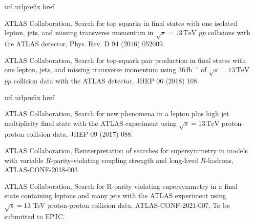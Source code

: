 \begin{thebibliography}{10}
\makeatletter
\renewcommand\@biblabel[1]{}
\makeatother
\expandafter\ifx\csname url\endcsname\relax
  \def\url#1{\texttt{#1}}\fi
\expandafter\ifx\csname urlprefix\endcsname\relax\def\urlprefix{URL }\fi
\expandafter\ifx\csname href\endcsname\relax
  \def\href#1#2{#2} \def\path#1{#1}\fi
  
{ATLAS Collaboration}, {Search for top squarks in final states with one
  isolated lepton, jets, and missing transverse momentum in \(\sqrt{s} =
  13\,\text{TeV}\) \(pp\) collisions with the ATLAS detector},
  \href {http://dx.doi.org/10.1103/PhysRevD.94.052009}
  {Phys. Rev. D 94 (2016) 052009}.


{ATLAS Collaboration}, {Search for top-squark pair production in final states
  with one lepton, jets, and missing transverse momentum using
  \(36\,\text{fb}^{-1}\) of \(\sqrt{s} = 13\,\text{TeV}\) \(pp\) collision data
  with the ATLAS detector}, 
  \href {http://dx.doi.org/10.1007/JHEP06(2018)108}
  {JHEP 06 (2018) 108}.
  
\end{thebibliography}

\begin{thebibliography}{10}
\makeatletter
\renewcommand\@biblabel[1]{}
\makeatother
\expandafter\ifx\csname url\endcsname\relax
  \def\url#1{\texttt{#1}}\fi
\expandafter\ifx\csname urlprefix\endcsname\relax\def\urlprefix{URL }\fi
\expandafter\ifx\csname href\endcsname\relax
  \def\href#1#2{#2} \def\path#1{#1}\fi

{ATLAS Collaboration}, {Search for new phenomena in a lepton plus high jet
  multiplicity final state with the ATLAS experiment using \(\sqrt{s} =
  13\,\text{TeV}\) proton--proton collision data}, 
  \href {http://dx.doi.org/10.1007/JHEP09(2017)088}
  {JHEP 09 (2017) 088}.
  
  
{ATLAS Collaboration}, {Reinterpretation of searches for
  supersymmetry in models with variable \(R\)-parity-violating coupling
  strength and long-lived \(R\)-hadrons}, 
  \href{https://cds.cern.ch/record/2308391}{ATLAS-CONF-2018-003}.  


{ATLAS Collaboration}, {Search
  for R-parity violating supersymmetry in a final state containing leptons and
  many jets with the ATLAS experiment using $\sqrt{s}=13$ TeV proton-proton
  collision data}, \href{https://atlas.web.cern.ch/Atlas/GROUPS/PHYSICS/CONFNOTES/ATLAS-CONF-2021-007/}{ATLAS-CONF-2021-007}. To be submitted to EPJC.

\end{thebibliography}

